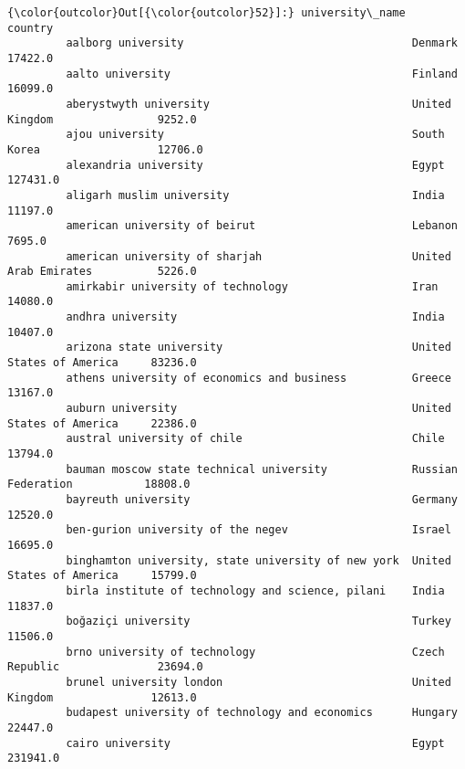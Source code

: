 \documentclass[11pt]{article}
\begin{document}
\begin{Verbatim}[commandchars=\\\{\}]
{\color{outcolor}Out[{\color{outcolor}52}]:} university\_name                                      country                 
         aalborg university                                   Denmark                      17422.0
         aalto university                                     Finland                      16099.0
         aberystwyth university                               United Kingdom                9252.0
         ajou university                                      South Korea                  12706.0
         alexandria university                                Egypt                       127431.0
         aligarh muslim university                            India                        11197.0
         american university of beirut                        Lebanon                       7695.0
         american university of sharjah                       United Arab Emirates          5226.0
         amirkabir university of technology                   Iran                         14080.0
         andhra university                                    India                        10407.0
         arizona state university                             United States of America     83236.0
         athens university of economics and business          Greece                       13167.0
         auburn university                                    United States of America     22386.0
         austral university of chile                          Chile                        13794.0
         bauman moscow state technical university             Russian Federation           18808.0
         bayreuth university                                  Germany                      12520.0
         ben-gurion university of the negev                   Israel                       16695.0
         binghamton university, state university of new york  United States of America     15799.0
         birla institute of technology and science, pilani    India                        11837.0
         boğaziçi university                                  Turkey                       11506.0
         brno university of technology                        Czech Republic               23694.0
         brunel university london                             United Kingdom               12613.0
         budapest university of technology and economics      Hungary                      22447.0
         cairo university                                     Egypt                       231941.0

\end{Verbatim}
\end{document}
